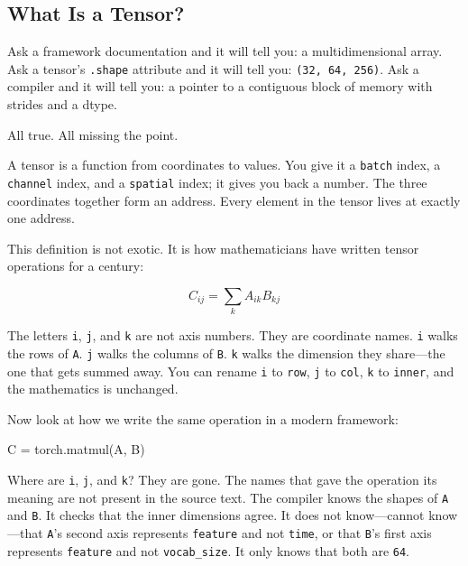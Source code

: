 \documentclass[11pt,titlepage]{article}
\newenvironment{Shaded}{}{}
\newcommand{\NormalTok}[1]{#1}
\newcommand{\OperatorTok}[1]{\textcolor[rgb]{0.40,0.40,0.40}{#1}}
\begin{document}
\vspace{2em}

\hypertarget{what-is-a-tensor}{%
\subsection{What Is a Tensor?}\label{what-is-a-tensor}}

Ask a framework documentation and it will tell you: a multidimensional
array. Ask a tensor's \texttt{.shape} attribute and it will tell you:
\texttt{(32,\ 64,\ 256)}. Ask a compiler and it will tell you: a pointer
to a contiguous block of memory with strides and a dtype.

All true. All missing the point.

A tensor is a function from coordinates to values. You give it a
\texttt{batch} index, a \texttt{channel} index, and a \texttt{spatial}
index; it gives you back a number. The three coordinates together form
an address. Every element in the tensor lives at exactly one address.

This definition is not exotic. It is how mathematicians have written
tensor operations for a century:

\[C_{ij} = \sum_k A_{ik} B_{kj}\]

The letters \texttt{i}, \texttt{j}, and \texttt{k} are not axis numbers.
They are coordinate names. \texttt{i} walks the rows of \texttt{A}.
\texttt{j} walks the columns of \texttt{B}. \texttt{k} walks the
dimension they share---the one that gets summed away. You can rename
\texttt{i} to \texttt{row}, \texttt{j} to \texttt{col}, \texttt{k} to
\texttt{inner}, and the mathematics is unchanged.

Now look at how we write the same operation in a modern framework:

\begin{Shaded}
\begin{Highlighting}[]
\NormalTok{C }\OperatorTok{=}\NormalTok{ torch.matmul(A, B)}
\end{Highlighting}
\end{Shaded}

Where are \texttt{i}, \texttt{j}, and \texttt{k}? They are gone. The
names that gave the operation its meaning are not present in the source
text. The compiler knows the shapes of \texttt{A} and \texttt{B}. It
checks that the inner dimensions agree. It does not know---cannot
know---that \texttt{A}'s second axis represents \texttt{feature} and not
\texttt{time}, or that \texttt{B}'s first axis represents
\texttt{feature} and not \texttt{vocab\_size}. It only knows that both
are \texttt{64}.
\end{document}
